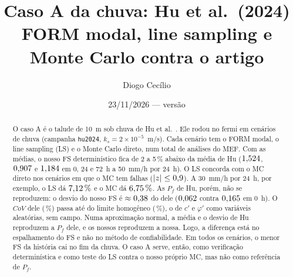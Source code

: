 \documentclass[11pt,a4paper]{article}
\title{Caso A da chuva: Hu et al.\ (2024)\\ FORM modal, line sampling e Monte Carlo contra o artigo}
\author{Diogo Cecílio}
\date{23/11/2026 --- versão \versao}
\begin{document}
\maketitle
\begin{abstract}
O caso A é o talude de 10~m sob chuva de Hu et al.~\cite{hu2024}. Ele rodou no fermi em \nCasos{} cenários de chuva
(campanha \texttt{hu2024}, $k_s = 2 \times 10^{-5}$~m/s). Cada cenário tem o FORM modal, o line sampling (LS) e o Monte
Carlo direto, num total de \nTot{} análises do MEF. Com as médias, o nosso FS determinístico fica de 2 a 5\,\% abaixo
da média de Hu ($1{,}524$, $0{,}907$ e $1{,}184$ em 0, 24 e 72~h a 50~mm/h por 24~h). O LS concorda com o
MC direto nos \nZ{} cenários em que o MC tem falhas ($|z| \le 0{,}9$). A 30~mm/h por 24~h, por exemplo, o LS dá
$7{,}12\,\%$ e o MC dá $6{,}75\,\%$. As $P_f$ de Hu, porém, não se reproduzem: o desvio do nosso FS é
$\approx 0{,}38$ do dele ($0{,}062$ contra $0{,}165$ em 0~h). O $CoV$ dele (\cvHuZero\,\%) passa até do limite
homogêneo (\cvHomZero\,\%), o de $c'$ e $\varphi'$ como variáveis aleatórias, sem campo. Numa aproximação normal, a
média e o desvio de Hu reproduzem a $P_f$ dele, e os nossos reproduzem a nossa. Logo, a diferença está no espalhamento
do FS e não no método de confiabilidade. Em todos os cenários, o menor FS da história cai no fim da chuva. O caso A
serve, então, como verificação determinística e como teste do LS contra o nosso próprio MC, mas não como referência de
$P_f$.
\end{abstract}
\tableofcontents
\end{document}
